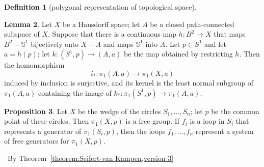 \documentclass[12pt,a4paper]{book}
\newenvironment{prooff}{{\noindent\it\textcolor{cyan!40!black}{Proof}:}\,}{\par}
\newcommand{\bb}[1]{\mathbb{#1}}
\theoremstyle{definition}
\newtheorem{defn}{Definition}[section]
\newtheorem{lem}[defn]{Lemma}
\newtheorem{prop}[defn]{Proposition}
\begin{document}
\begin{defn}[polygonal representation of topological space]
\end{defn}
\begin{lem}
    Let $X$ be a Hausdorff space; let $A$ be a closed path-connected subspace of $X$.
    Suppose that there is a continuous map $h: B^2 \rightarrow X$ that maps $B^2-\bb{S}^1$ bijectively onto $X-A$ and maps $\bb{S}^1$ into $A$. Let $p \in S^1$ and let $a=h(p)$; let $k:\left(S^1, p\right) \rightarrow(A, a)$ be the map obtained by restricting $h$. Then the homomorphism
    $$
        i_*: \pi_1(A, a) \longrightarrow \pi_1(X, a)
    $$
    induced by inclusion is surjective, and its kernel is the least normal subgroup of $\pi_1(A, a)$ containing the image of $k_*: \pi_1\left(S^1, p\right) \rightarrow \pi_1(A, a)$.
    \label{theorem:torus}
\end{lem}
\begin{prop}
    Let $X$ be the wedge of the circles $S_1, \ldots, S_n$; let $p$ be the common point of these circles. Then $\pi_1(X, p)$ is a free group. If $f_i$ is a loop in $S_i$ that represents a generator of $\pi_1\left(S_i, p\right)$, then the loops $f_1, \ldots, f_n$ represent a system of free generators for $\pi_1(X, p)$.
\end{prop}
\begin{prooff}
    By Theorem~\ref{theorem:Seifert-van Kampen,version 3}
\end{prooff}
\end{document}
